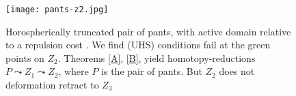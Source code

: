 \documentclass[12pt]{amsart}
\theoremstyle{definition}
\theoremstyle{remark}
\newcommand{\bR}{\mathbb{R}}
\newcommand{\del}{\partial}
\begin{document}
\begin{figure}
\centering
\texttt{[image: pants-z2.jpg]}
\caption{Horospherically truncated pair of pants, with active domain relative to a repulsion cost \cite[Ch.4]{martel}. We find (UHS) conditions fail at the green points on $Z_2$. Theorems \ref{A}, \ref{B}, yield homotopy-reductions $P \leadsto Z_1 \leadsto Z_2$, where $P$ is the pair of pants. But $Z_2$ does not deformation retract to $Z_3$}
\end{figure}









\end{document}
